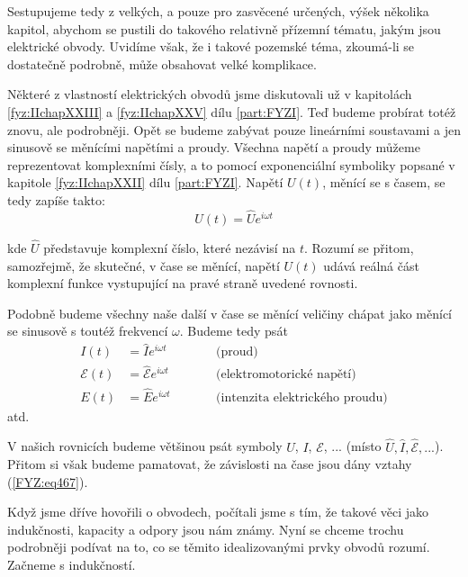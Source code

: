 {  Sestupujeme tedy z velkých, a pouze pro zasvěcené určených, výšek několika kapitol, abychom se 
  pustili do takového relativně přízemní tématu, jakým jsou elektrické obvody. Uvidíme však, že i 
  takové pozemské téma, zkoumá-li se dostatečně podrobně, může obsahovat velké komplikace.

  Některé z vlastností elektrických obvodů jsme diskutovali už v kapitolách \ref{fyz:IIchapXXIII} a 
  \ref{fyz:IIchapXXV} dílu \ref{part:FYZI}. Teď budeme probírat totéž znovu, ale podrobněji. Opět 
  se budeme zabývat pouze lineárními soustavami a jen sinusově se měnícími napětími a proudy. 
  Všechna napětí a proudy můžeme reprezentovat komplexními čísly, a to pomocí exponenciální 
  symboliky popsané v kapitole \ref{fyz:IIchapXXII} dílu \ref{part:FYZI}. Napětí \(U(t)\), 
  měnící se s časem, se tedy zapíše takto:
  \begin{equation}\label{fyz:eq466}
   U(t) = \hat{U}e^{i\omega t}
  \end{equation}
  
  kde \(\hat{U}\) představuje komplexní číslo, které nezávisí na \(t\). Rozumí se přitom, 
  samozřejmě, že skutečné, v čase se měnící, napětí \(U(t)\) udává reálná část komplexní funkce 
  vystupující na pravé straně uvedené rovnosti.
  
  Podobně budeme všechny naše další v čase se měnící veličiny chápat jako měnící se sinusově s 
  toutéž frekvencí \(\omega\). Budeme tedy psát
  \begin{subequations}\label{FYZ:eq467}
  \begin{alignat}{3}
    I(t) &= \hat{I}e^{i\omega t} &&\qquad\text{(proud)}                       \label{FYZ:eq467a} \\
    \mathscr{E}(t) 
         &= \hat{\mathscr{E}}e^{i\omega t} 
                                 &&\qquad\text{(elektromotorické napětí)}     \label{FYZ:eq467b} \\ 
    E(t) &= \hat{E}e^{i\omega t} &&\qquad\text{(intenzita elektrického proudu)} \label{FYZ:eq467c}
  \end{alignat}
  \end{subequations}
  atd. 
  
  V našich rovnicích budeme většinou psát symboly \(U\), \(I\), \(\mathscr{E}\), ... (místo 
  \(\hat{U}, \hat{I}, \hat{\mathscr{E}}, ...\)). Přitom si však budeme pamatovat, že závislosti na 
  čase jsou dány vztahy (\ref{FYZ:eq467}). 
  
  Když jsme dříve hovořili o obvodech, počítali jsme s tím, že takové věci jako indukčnosti, 
  kapacity a odpory jsou nám známy. Nyní se chceme trochu podrobněji podívat na to, co se těmito 
  idealizovanými prvky obvodů rozumí. Začneme s indukčností.

}
